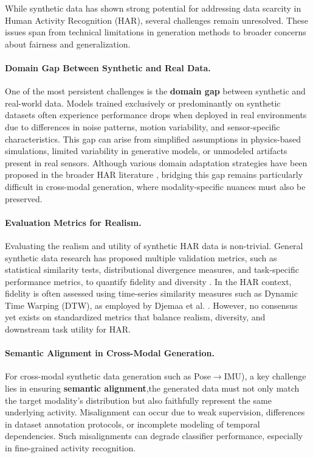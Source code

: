 While synthetic data has shown strong potential for addressing data scarcity in Human Activity Recognition (HAR), several challenges remain unresolved. These issues span from technical limitations in generation methods to broader concerns about fairness and generalization.

\paragraph{Domain Gap Between Synthetic and Real Data.}
One of the most persistent challenges is the \textbf{domain gap} between synthetic and real-world data. Models trained exclusively or predominantly on synthetic datasets often experience performance drops when deployed in real environments due to differences in noise patterns, motion variability, and sensor-specific characteristics. This gap can arise from simplified assumptions in physics-based simulations, limited variability in generative models, or unmodeled artifacts present in real sensors. Although various domain adaptation strategies have been proposed in the broader HAR literature \cite{mhalla2024domain}, bridging this gap remains particularly difficult in cross-modal generation, where modality-specific nuances must also be preserved.

\paragraph{Evaluation Metrics for Realism.}
Evaluating the realism and utility of synthetic HAR data is non-trivial. General synthetic data research has proposed multiple validation metrics, such as statistical similarity tests, distributional divergence measures, and task-specific performance metrics, to quantify fidelity and diversity \cite{kiran2023synthetic}. In the HAR context, fidelity is often assessed using time-series similarity measures such as Dynamic Time Warping (DTW), as employed by Djemaa et al. \cite{djemaa2024improved}. However, no consensus yet exists on standardized metrics that balance realism, diversity, and downstream task utility for HAR.

\paragraph{Semantic Alignment in Cross-Modal Generation.}
For cross-modal synthetic data generation such as Pose$\rightarrow$IMU), a key challenge lies in ensuring \textbf{semantic alignment},the generated data must not only match the target modality's distribution but also faithfully represent the same underlying activity. Misalignment can occur due to weak supervision, differences in dataset annotation protocols, or incomplete modeling of temporal dependencies. Such misalignments can degrade classifier performance, especially in fine-grained activity recognition.


